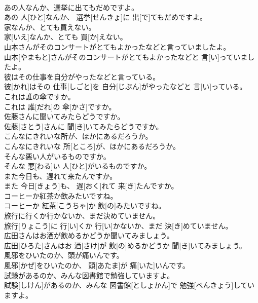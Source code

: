 \documentclass[8pt]{extreport}
\begin{document}
\begin{CJK}{UTF8}{min}
\\	あの人なんか、選挙に出てもだめですよ。	
\\	あの 人[ひと]なんか、 選挙[せんきょ]に 出[で]てもだめですよ。	
\\	家なんか、とても買えない。	
\\	家[いえ]なんか、とても 買[か]えない。	
\\	山本さんがそのコンサートがとてもよかったなどと言っていましたよ。	
\\	山本[やまもと]さんがそのコンサートがとてもよかったなどと 言[い]っていましたよ。	
\\	彼はその仕事を自分がやったなどと言っている。	
\\	彼[かれ]はその 仕事[しごと]を 自分[じぶん]がやったなどと 言[い]っている。	
\\	これは誰の傘ですか。	
\\	これは 誰[だれ]の 傘[かさ]ですか。	
\\	佐藤さんに聞いてみたらどうですか。	
\\	佐藤[さとう]さんに 聞[き]いてみたらどうですか。	
\\	こんなにきれいな所が、ほかにあるだろうか。	
\\	こんなにきれいな 所[ところ]が、ほかにあるだろうか。	
\\	そんな悪い人がいるものですか。	
\\	そんな 悪[わる]い 人[ひと]がいるものですか。	
\\	また今日も、遅れて来たんですか。	
\\	また 今日[きょう]も、 遅[おく]れて 来[き]たんですか。	
\\	コーヒーか紅茶か飲みたいですね。	
\\	コーヒーか 紅茶[こうちゃ]か 飲[の]みたいですね。	
\\	旅行に行くか行かないか、まだ決めていません。	
\\	旅行[りょこう]に 行[い]くか 行[い]かないか、まだ 決[き]めていません。	
\\	広田さんはお酒が飲めるかどうか聞いてみましょう。	
\\	広田[ひろた]さんはお 酒[さけ]が 飲[の]めるかどうか 聞[き]いてみましょう。	
\\	風邪をひいたのか、頭が痛いんです。	
\\	風邪[かぜ]をひいたのか、 頭[あたま]が 痛[いた]いんです。	
\\	試験があるのか、みんな図書館で勉強していますよ。	
\\	試験[しけん]があるのか、みんな 図書館[としょかん]で 勉強[べんきょう]していますよ。	

\end{CJK}
\end{document}
